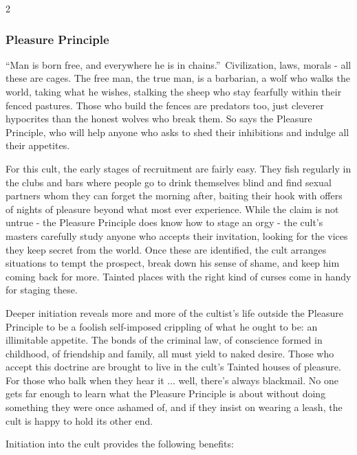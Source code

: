 \begin{multicols}{2}
\subsubsection*{Pleasure Principle}
\textquotedblleft Man is born free, and everywhere he is in chains.\textquotedblright\, Civilization, laws, morals - all these are cages. The free man, the true man, is a barbarian, a wolf who walks the world, taking what he wishes, stalking the sheep who stay fearfully within their fenced pastures. Those who build the fences are predators too, just cleverer hypocrites than the honest wolves who break them. So says the Pleasure Principle, who will help anyone who asks to shed their inhibitions and indulge all their appetites.

For this cult, the early stages of recruitment are fairly easy. They fish regularly in the clubs and bars where people go to drink themselves blind and find sexual partners whom they can forget the morning after, baiting their hook with offers of nights of pleasure beyond what most ever experience. While the claim is not untrue - the Pleasure Principle does know how to stage an orgy - the cult’s masters carefully study anyone who accepts their invitation, looking for the vices they keep secret from the world. Once these are identified, the cult arranges situations to tempt the prospect, break down his sense of shame, and keep him coming back for more. Tainted places with the right kind of curses come in handy for staging these.

Deeper initiation reveals more and more of the cultist’s life outside the Pleasure Principle to be a foolish self-imposed crippling of what he ought to be: an illimitable appetite. The bonds of the criminal law, of conscience formed in childhood, of friendship and family, all must yield to naked desire. Those who accept this doctrine are brought to live in the cult’s Tainted houses of pleasure. For those who balk when they hear it ... well, there’s always blackmail. No one gets far enough to learn what the Pleasure Principle is about without doing something they were once ashamed of, and if they insist on wearing a leash, the cult is happy to hold its other end.

Initiation into the cult provides the following benefits: \\


\end{multicols}
